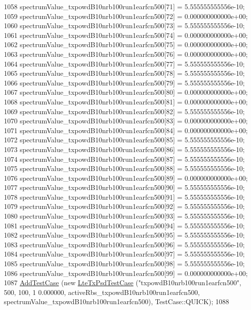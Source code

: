 \begin{DoxyCode}
1058   spectrumValue\_txpowdB10nrb100run1earfcn500[71] = 5.555555555556e-10;
1059   spectrumValue\_txpowdB10nrb100run1earfcn500[72] = 0.000000000000e+00;
1060   spectrumValue\_txpowdB10nrb100run1earfcn500[73] = 5.555555555556e-10;
1061   spectrumValue\_txpowdB10nrb100run1earfcn500[74] = 0.000000000000e+00;
1062   spectrumValue\_txpowdB10nrb100run1earfcn500[75] = 0.000000000000e+00;
1063   spectrumValue\_txpowdB10nrb100run1earfcn500[76] = 0.000000000000e+00;
1064   spectrumValue\_txpowdB10nrb100run1earfcn500[77] = 5.555555555556e-10;
1065   spectrumValue\_txpowdB10nrb100run1earfcn500[78] = 5.555555555556e-10;
1066   spectrumValue\_txpowdB10nrb100run1earfcn500[79] = 5.555555555556e-10;
1067   spectrumValue\_txpowdB10nrb100run1earfcn500[80] = 0.000000000000e+00;
1068   spectrumValue\_txpowdB10nrb100run1earfcn500[81] = 0.000000000000e+00;
1069   spectrumValue\_txpowdB10nrb100run1earfcn500[82] = 5.555555555556e-10;
1070   spectrumValue\_txpowdB10nrb100run1earfcn500[83] = 0.000000000000e+00;
1071   spectrumValue\_txpowdB10nrb100run1earfcn500[84] = 0.000000000000e+00;
1072   spectrumValue\_txpowdB10nrb100run1earfcn500[85] = 5.555555555556e-10;
1073   spectrumValue\_txpowdB10nrb100run1earfcn500[86] = 5.555555555556e-10;
1074   spectrumValue\_txpowdB10nrb100run1earfcn500[87] = 5.555555555556e-10;
1075   spectrumValue\_txpowdB10nrb100run1earfcn500[88] = 5.555555555556e-10;
1076   spectrumValue\_txpowdB10nrb100run1earfcn500[89] = 0.000000000000e+00;
1077   spectrumValue\_txpowdB10nrb100run1earfcn500[90] = 5.555555555556e-10;
1078   spectrumValue\_txpowdB10nrb100run1earfcn500[91] = 5.555555555556e-10;
1079   spectrumValue\_txpowdB10nrb100run1earfcn500[92] = 5.555555555556e-10;
1080   spectrumValue\_txpowdB10nrb100run1earfcn500[93] = 5.555555555556e-10;
1081   spectrumValue\_txpowdB10nrb100run1earfcn500[94] = 5.555555555556e-10;
1082   spectrumValue\_txpowdB10nrb100run1earfcn500[95] = 5.555555555556e-10;
1083   spectrumValue\_txpowdB10nrb100run1earfcn500[96] = 5.555555555556e-10;
1084   spectrumValue\_txpowdB10nrb100run1earfcn500[97] = 5.555555555556e-10;
1085   spectrumValue\_txpowdB10nrb100run1earfcn500[98] = 5.555555555556e-10;
1086   spectrumValue\_txpowdB10nrb100run1earfcn500[99] = 0.000000000000e+00;
1087   \hyperlink{classns3_1_1TestCase_a3718088e3eefd5d6454569d2e0ddd835}{AddTestCase} (\textcolor{keyword}{new} \hyperlink{classLteTxPsdTestCase}{LteTxPsdTestCase} (\textcolor{stringliteral}{"txpowdB10nrb100run1earfcn500"}, 500, 100, 1
      0.000000, activeRbs\_txpowdB10nrb100run1earfcn500, spectrumValue\_txpowdB10nrb100run1earfcn500), 
      TestCase::QUICK);
1088 

\end{DoxyCode}
